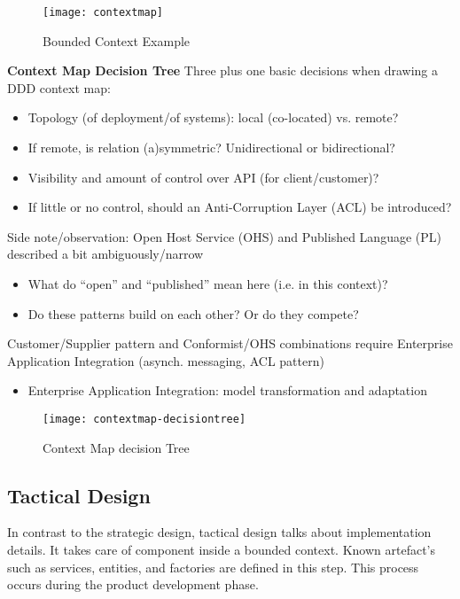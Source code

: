 \begin{figure}[H]
  \center
  \texttt{[image: contextmap]}
  \caption{Bounded Context Example}
  \label{fig:contextmap}
\end{figure}

\textbf{Context Map Decision Tree}
Three plus one basic decisions when drawing a DDD context map: 
\begin{itemize}
  \item Topology (of deployment/of systems): local (co-located) vs. remote? 
  \item If remote, is relation (a)symmetric? Unidirectional or bidirectional?
  \item Visibility and amount of control over API (for client/customer)? 
  \item If little or no control, should an Anti-Corruption Layer (ACL) be introduced? 
\end{itemize}

Side note/observation: Open Host Service (OHS) and Published Language (PL) described a bit ambiguously/narrow 
\begin{itemize}
  \item What do “open” and “published” mean here (i.e. in this context)? 
  \item Do these patterns build on each other? Or do they compete? 
\end{itemize}
Customer/Supplier pattern and Conformist/OHS combinations require Enterprise Application Integration (asynch. messaging, ACL pattern) 
\begin{itemize}
  \item Enterprise Application Integration: model transformation and adaptation
\end{itemize}

\begin{figure}[H]
  \center
  \texttt{[image: contextmap-decisiontree]}
  \caption{Context Map decision Tree}
  \label{fig:contextmap-decisiontree}
\end{figure}

\pagebreak

\subsection{Tactical Design}
In contrast to the strategic design, tactical design talks about implementation details. It takes care of component inside a bounded context. Known artefact's such as services, entities, and factories are defined in this step. This process occurs during the product development phase.

